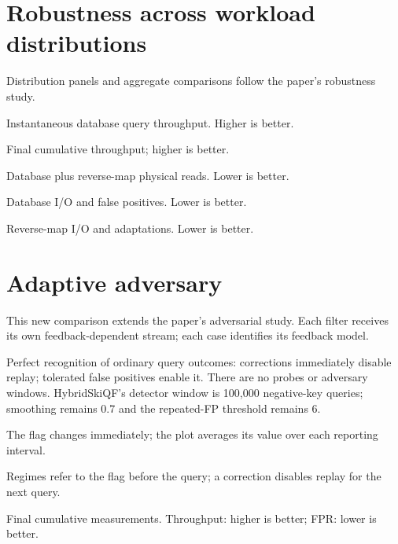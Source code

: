 \section{Robustness across workload distributions}
Distribution panels and aggregate comparisons follow the paper's robustness study.

\begin{center}\small Instantaneous database query throughput. Higher is better.\end{center}

\begin{center}\small Final cumulative throughput; higher is better.\end{center}
\clearpage

\begin{center}\small Database plus reverse-map physical reads. Lower is better.\end{center}
\clearpage

\begin{center}\small Database I/O and false positives. Lower is better.\end{center}
\clearpage

\begin{center}\small Reverse-map I/O and adaptations. Lower is better.\end{center}
\clearpage
\section{Adaptive adversary}
This new comparison extends the paper's adversarial study. Each filter receives its own feedback-dependent stream; each case identifies its feedback model.

\begin{center}\small Perfect recognition of ordinary query outcomes: corrections immediately disable replay; tolerated false positives enable it. There are no probes or adversary windows. HybridSkiQF's detector window is 100,000 negative-key queries; smoothing remains 0.7 and the repeated-FP threshold remains 6.\end{center}

\begin{center}\small The flag changes immediately; the plot averages its value over each reporting interval.\end{center}

\begin{center}\small Regimes refer to the flag before the query; a correction disables replay for the next query.\end{center}

\begin{center}\small Final cumulative measurements. Throughput: higher is better; FPR: lower is better.\end{center}
